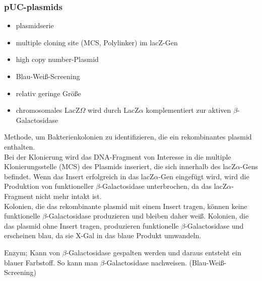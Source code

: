 \subsubsection{pUC-\glspl{plasmid}}
\begin{itemize}
    \item \gls{plasmid}serie
    \item multiple cloning site (MCS, \gls{Polylinker}) im lacZ-Gen   
    \item high copy number-Plasmid
    \item Blau-Weiß-Screening 
    \item relativ geringe Größe
    \item chromosomales LacZ$\Omega$ wird durch LacZ$\alpha$ komplementiert zur
aktiven $\beta$-Galactosidase  
\end{itemize}
\begin{mybox}[title=Was ist Blau-Weiß-Screening?]
Methode, um Bakterienkolonien zu identifizieren, die ein rekombinantes \gls{plasmid} enthalten. \\ Bei der Klonierung wird das DNA-Fragment von Interesse in die multiple Klonierungsstelle (MCS) des Plasmids inseriert, die sich innerhalb des lacZ$\alpha$-Gens befindet. Wenn das Insert erfolgreich in das lacZ$\alpha$-Gen eingefügt wird, wird die Produktion von funktioneller $\beta$-Galactosidase unterbrochen, da das lacZ$\alpha$-Fragment nicht mehr intakt ist. \\
Kolonien, die das rekombinante \gls{plasmid} mit einem Insert tragen, können keine funktionelle $\beta$-Galactosidase produzieren und bleiben daher weiß. Kolonien, die das \gls{plasmid} ohne Insert tragen, produzieren funktionelle $\beta$-Galactosidase und erscheinen blau, da sie \gls{X-Gal} in das blaue Produkt umwandeln.   
\end{mybox}
\begin{mechanism}[title=Was macht X-Gal?]
Enzym; Kann von $\beta$-Galactosidase gespalten werden und daraus entsteht ein blauer Farbstoff. So kann man $\beta$-Galactosidase nachweisen. (Blau-Weiß-Screening)
\end{mechanism}
